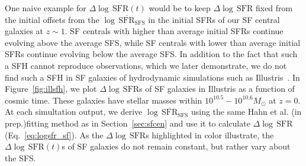 \documentclass[12pt, letterpaper, preprint, tighten]{aastex}
\newcommand{\logsfr}{\log \, \mathrm{SFR}}
\newcommand{\musfms}{\log\,\overline{\mathrm{SFR}}_\mathrm{SFS}}
\newcommand{\hahngmm}{Hahn et al. (in prep.)}
\begin{document}
One naive example for $\Delta \logsfr(t)$ would be to keep 
$\Delta \logsfr$ fixed from the initial offsets from the $\musfms$
in the initial SFRs of our SF central galaxies at $z\sim1$.
SF centrals with higher than average initial SFRs continue evolving 
above the average SFS, while SF centrals with lower than average 
initial SFRs continue evolving below the average SFS. In addition to 
the fact that such a SFH cannot reproduce observations, which we later 
demonstrate, we do not find such a SFH in SF galaxies of hydrodynamic 
simulations such as Illustris~\cite{vogelsberger2014,genel2014}. 
In Figure~\ref{fig:illsfh}, we plot $\Delta \logsfr$s of SF galaxies 
in Illustris as a function of cosmic time. These galaxies have stellar 
masses within $10^{10.5}-10^{10.6}M_\odot$ at $z=0$. At each simultation 
output, we derive $\musfms$ using the same \hahngmm fitting method as in
Section~\ref{sec:sfcen} and use it to calculate $\Delta \logsfr$ 
(Eq.~\ref{eq:logsfr_sf}). As the $\Delta \logsfr$s highlighted in color 
illustrate, the $\Delta \logsfr(t)$s of SF galaxies do not remain constant, 
but rather vary about the SFS. 
\end{document}
